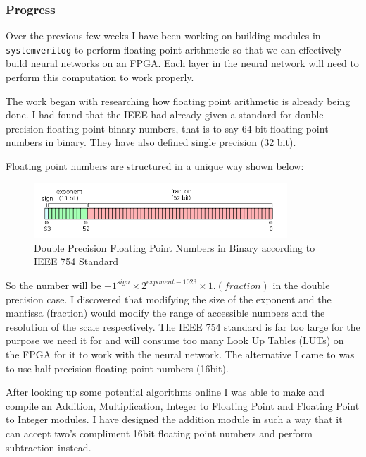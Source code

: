 \subsubsection{Progress}
Over the previous few weeks I have been working on building modules in \texttt{systemverilog} to perform floating point arithmetic so that we can effectively build neural networks on an FPGA. Each layer in the neural network will need to perform this computation to work properly.\newline

The work began with researching how floating point arithmetic is already being done. I had found that the IEEE had already given a standard for double precision floating point binary numbers, that is to say 64 bit floating point numbers in binary. They have also defined single precision (32 bit).\newline

Floating point numbers are structured in a unique way shown below:
\begin{figure}[H]
	\centering
	\includegraphics[width=0.85\textwidth]{resources/Double_precision.PNG}
	\caption{Double Precision Floating Point Numbers in Binary according to IEEE 754 Standard}
	\label{fig:double_precision}	
\end{figure}
So the number will be $-1^{sign} \times 2^{exponent - 1023} \times  1.(fraction)$ in the double precision case.\newline
I discovered that modifying the size of the exponent and the mantissa (fraction) would modify the range of accessible numbers and the resolution of the scale respectively. The IEEE 754 standard is far too large for the purpose we need it for and will consume too many Look Up Tables (LUTs) on the FPGA for it to work with the neural network. The alternative I came to was to use half precision floating point numbers (16bit).\newline

After looking up some potential algorithms online I was able to make and compile an Addition, Multiplication, Integer to Floating Point and Floating Point to Integer modules. I have designed the addition module in such a way that it can accept two's compliment 16bit floating point numbers and perform subtraction instead.

